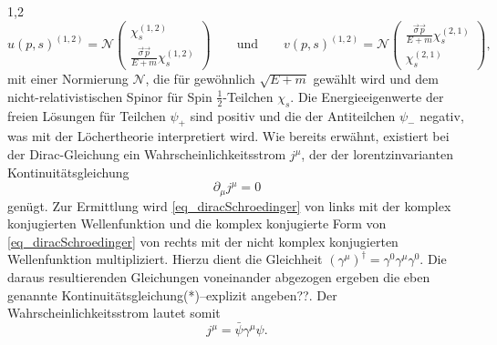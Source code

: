 \documentclass[11pt,a4paper,twoside]{report}
\begin{document}
\begin{spacing}{1,2}
\begin{equation}
 u(p,s)^{(1,2)} = \mathcal{N} \begin{pmatrix}
                          \chi_s^{(1,2)}\\
                          \frac{\vec \sigma \vec p}{E+m} \chi_s^{(1,2)}
                         \end{pmatrix} \qquad \text{und}\qquad v(p,s)^{(1,2)} = \mathcal{N} \begin{pmatrix}
                          \frac{\vec \sigma \vec p}{E+m} \chi_s^{(2,1)}\\
                          \chi_s^{(2,1)}                          
                         \end{pmatrix},
\end{equation}
mit einer Normierung $\mathcal{N}$, die für gewöhnlich $\sqrt{E + m}$ gewählt wird und dem nicht-relativistischen Spinor für Spin $\frac12$-Teilchen $\chi_s$.
Die Energieeigenwerte der freien Lösungen für Teilchen $\psi_+$ sind positiv und die der Antiteilchen $\psi_-$ negativ, was mit der Löchertheorie interpretiert
wird. Wie bereits erwähnt, existiert bei der Dirac-Gleichung ein Wahrscheinlichkeitsstrom $j^\mu$, der der lorentzinvarianten Kontinuitätsgleichung
\begin{equation}
 \partial_\mu j^\mu = 0
\end{equation}
genügt. Zur Ermittlung wird \eqref{eq_diracSchroedinger} von links mit der komplex konjugierten Wellenfunktion und die komplex konjugierte
Form von \eqref{eq_diracSchroedinger} von rechts mit der nicht komplex konjugierten Wellenfunktion multipliziert. Hierzu dient die Gleichheit 
$(\gamma^\mu)^\dagger = \gamma^0\gamma^\mu\gamma^0$. Die daraus resultierenden Gleichungen voneinander abgezogen ergeben die eben genannte Kontinuitätsgleichung(*)--explizit angeben??.
Der Wahrscheinlichkeitsstrom lautet somit
\begin{equation}
 j^\mu = \bar \psi \gamma^\mu \psi.
 \label{eq_diracstrom}
\end{equation}



\end{spacing}
\end{document}
